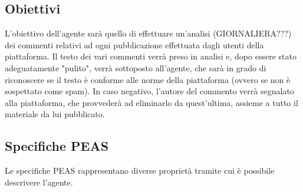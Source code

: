\documentclass{article} %
\begin{document}
    \subsection{Obiettivi}
    L'obiettivo dell'agente sarà quello di effettuare un'analisi (GIORNALIERA???) dei commenti relativi ad ogni pubblicazione effettuata dagli utenti della piattaforma.
    Il testo dei vari commenti verrà preso in analisi e, dopo essere stato adeguatamente "pulito", verrà sottoposto all'agente, che sarà in grado di riconoscere se il 
    testo è conforme alle norme della piattaforma (ovvero se non è sospettato come spam). \newline
    In caso negativo, l'autore del commento verrà segnalato alla piattaforma, che provvederà ad eliminarlo da quest'ultima, assieme a tutto il materiale da lui pubblicato.

    \subsection{Specifiche PEAS}
    Le specifiche PEAS rappresentano diverse proprietà tramite cui è possibile descrivere l'agente. \newline
\end{document}

